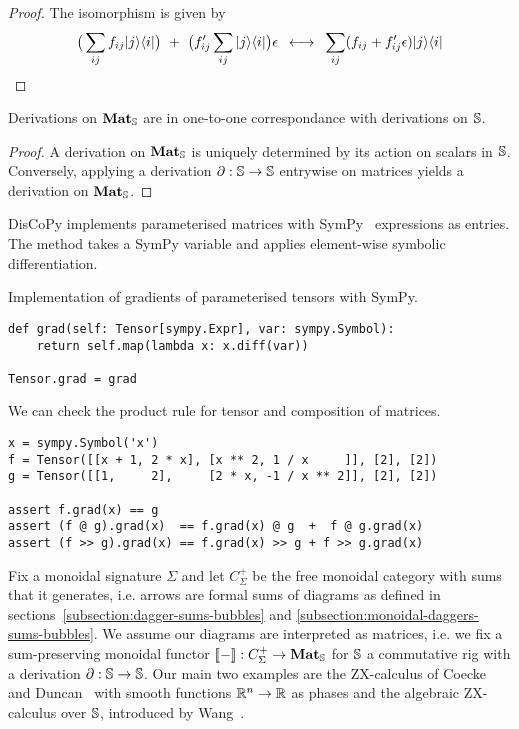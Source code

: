 \begin{proof}
The isomorphism is given by
$$\big( \sum_{ij} f_{ij} \ket{j} \bra{i} \big)
\ + \ \big( f'_{ij} \sum_{ij} \ket{j}  \bra{i} \big) \epsilon
\s \longleftrightarrow \s
\sum_{ij} (f_{ij} + f'_{ij} \epsilon) \ket{j} \bra{i}$$
\end{proof}

\begin{proposition}
Derivations on $\mathbf{Mat}_\S$ are in one-to-one correspondance with
derivations on $\S$.
\end{proposition}

\begin{proof}
A derivation on $\mathbf{Mat}_\S$ is uniquely determined by its action on
scalars in $\S$. Conversely, applying a derivation $\partial : \S \to \S$
entrywise on matrices yields a derivation on $\mathbf{Mat}_\S$.
\end{proof}

DisCoPy implements parameterised matrices with SymPy~\cite{MeurerEtAl17} expressions as entries.
The method  takes a SymPy variable and applies element-wise symbolic differentiation.

\begin{python}
{\normalfont Implementation of gradients of parameterised tensors with SymPy.}

\begin{verbatim}
def grad(self: Tensor[sympy.Expr], var: sympy.Symbol):
    return self.map(lambda x: x.diff(var))

Tensor.grad = grad
\end{verbatim}
\end{python}

\begin{example}
We can check the product rule for tensor and composition of matrices.

\begin{verbatim}
x = sympy.Symbol('x')
f = Tensor([[x + 1, 2 * x], [x ** 2, 1 / x     ]], [2], [2])
g = Tensor([[1,     2],     [2 * x, -1 / x ** 2]], [2], [2])

assert f.grad(x) == g
assert (f @ g).grad(x)  == f.grad(x) @ g  +  f @ g.grad(x)
assert (f >> g).grad(x) == f.grad(x) >> g + f >> g.grad(x)
\end{verbatim}
\end{example}

Fix a monoidal signature $\Sigma$ and let $C_\Sigma^+$ be the free monoidal category with sums that it generates, i.e. arrows are formal sums of diagrams as defined in sections~\ref{subsection:dagger-sums-bubbles} and \ref{subsection:monoidal-daggers-sums-bubbles}.
We assume our diagrams are interpreted as matrices, i.e. we fix a sum-preserving monoidal functor $[\![-]\!]  : C_\Sigma^+ \to \mathbf{Mat}_\S$ for $\S$ a commutative rig with a derivation $\partial : \S \to \S$.
Our main two examples are the ZX-calculus of Coecke and Duncan~\cite{CoeckeDuncan08} with smooth functions $\R^n \to \R$ as phases and the algebraic ZX-calculus over $\S$, introduced by Wang~\cite{Wang20}.

